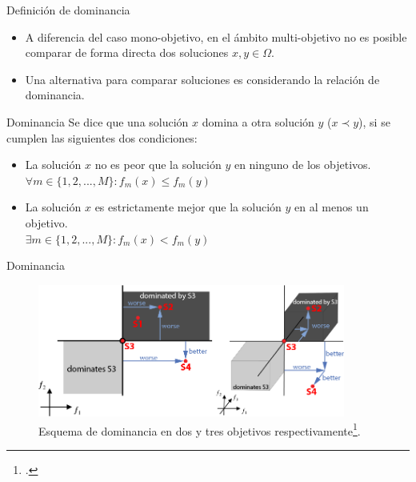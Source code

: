 \documentclass{beamer}
\begin{document}
\begin{frame}{Definición de dominancia}
\justifying
\begin{itemize}
\justifying
    \item A diferencia del caso mono-objetivo, en el ámbito multi-objetivo no es posible comparar de forma directa dos soluciones $x, y \in \Omega$.
    \item Una alternativa para comparar soluciones es considerando la relación de dominancia.
\end{itemize}
\begin{mydef}{Dominancia}{}
\scriptsize
Se dice que una solución $x$ domina a otra solución $y$ ($x \prec y$), si se cumplen las siguientes dos condiciones:
    \begin{itemize}
        \item La solución $x$ no es peor que la solución $y$ en ninguno de los objetivos.\\
$\forall m \in \{ 1, 2, ..., M \}: f_m(x) \leq f_m(y)$
\justifying
        \item La solución $x$ es estrictamente mejor que la solución $y$ en al menos un objetivo.\\
$\exists m \in \{ 1, 2, ..., M \}: f_m(x) < f_m(y)$
    \end{itemize}
\end{mydef}
\end{frame}

\begin{frame}{Dominancia}
\begin{figure}[H]
\centering
\includegraphics[width=0.9\textwidth]{dominance_scheme.png}
\caption{\scriptsize Esquema de dominancia en dos y tres objetivos respectivamente\footcite{WinNT}.}
\end{figure}
\end{frame}
\end{document}
